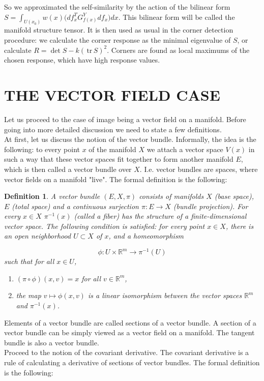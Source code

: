 \documentclass[a4paper,twoside]{article}
\newtheorem{definition}{Definition}
\newcommand{\Rm}{{\mathbb{R}}^m}
\newcommand {\tr}{{\,}\mathrm{tr}{\,}}
\begin{document}
So we approximated the self-similarity by the action of the bilinear form $S = \int_{U(x_0)} w(x) \big(df_x^T G^Y_{f(x)} df_x\big) dx$. This bilinear form will be called the manifold structure tensor. It is then used as usual in the corner detection procedure: we calculate the corner response as the minimal eigenvalue of $S$, or calculate $R=\det S - k (\tr S)^2$. Corners are found as local maximums of the chosen response, which have high response values.
\section{\uppercase{The vector field case}}
\noindent Let us proceed to the case of image being a vector field on a manifold. Before going into more detailed discussion we need to state a few definitions.
\\
At first, let us discuss the notion of the vector bundle. Informally, the idea is the following: to every point $x$ of the manifold $X$ we attach a vector space $V(x)$ in such a way that these vector spaces fit together to form another manifold $E$, which is then called a vector bundle over $X$. I.e. vector bundles are spaces, where vector fields on a manifold "live". The formal definition is the following: 
\begin{definition}
A vector bundle $(E, X, \pi)$ consists of manifolds $X$ (base space), $E$ (total space) and a continuous surjection $\pi : E \to X$ (bundle projection). For every $x \in X$ $\pi^{-1}(x)$ (called a fiber) has the structure of a finite-dimensional vector space. The following condition is satisfied: for every point $x \in X$, there is an open neighborhood $U \subset X$ of $x$, and a homeomorphism

$$\phi : U\times \Rm \to \pi ^{-1}(U)$$
such that for all $x \in U$,
\begin{enumerate}
\item $(\pi \circ \phi )(x,v)=x$ for all $v \in \Rm$, 
\item the map $v\mapsto \phi (x,v)$ is a linear isomorphism between the vector spaces $\Rm$ and $\pi^{-1}(x)$. 
\end{enumerate}
\end{definition}
Elements of a vector bundle are called sections of a vector bundle. A section of a vector bundle can be simply viewed as a vector field on a manifold. The tangent bundle is also a vector bundle. 
\\
Proceed to the notion of the covariant derivative. The covariant derivative is a rule of calculating a derivative of sections of vector bundles. The formal definition is the following:
\end{document}
